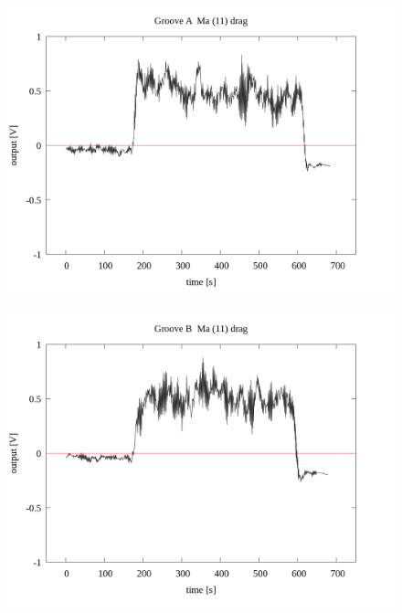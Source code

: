 \documentclass[a4paper]{jsarticle}
\begin{document}
\begin{figure}[htbp]
    \footnotesize
    \begin{center}
        \includegraphics[width=140mm]{../../../33_result/210806/moving_average/11/drag/Groove_A_ma(11)_drag.png}
    \end{center}
\end{figure}

\begin{figure}[htbp]
    \footnotesize
    \begin{center}
        \includegraphics[width=140mm]{../../../33_result/210806/moving_average/11/drag/Groove_B_ma(11)_drag.png}
    \end{center}
\end{figure}
\end{document}
